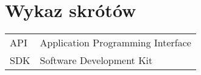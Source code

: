 \chapter*{Wykaz skrótów}

\begin{tabular}{l l}
API & Application Programming Interface \\
SDK & Software Development Kit \\


\end{tabular}
